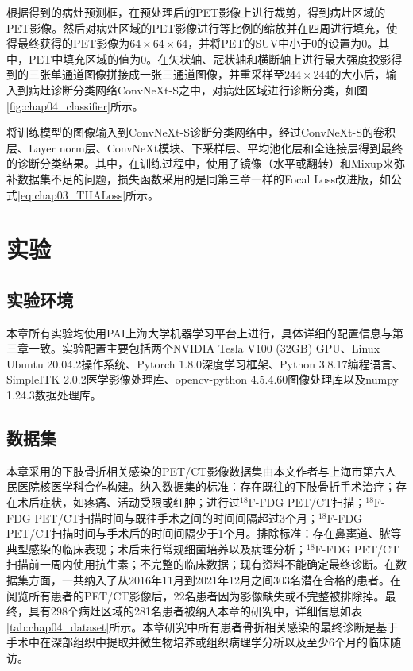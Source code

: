 根据得到的病灶预测框，在预处理后的PET影像上进行裁剪，得到病灶区域的PET影像。然后对病灶区域的PET影像进行等比例的缩放并在四周进行填充，使得最终获得的PET影像为\(64\times64\times64\)，并将PET的SUV中小于0的设置为0。其中，PET中填充区域的值为0。在矢状轴、冠状轴和横断轴上进行最大强度投影得到的三张单通道图像拼接成一张三通道图像，并重采样至\(244 \times 244\)的大小后，输入到病灶诊断分类网络ConvNeXt-S之中，对病灶区域进行诊断分类，如图\ref{fig:chap04_classifier}所示。

将训练模型的图像输入到ConvNeXt-S诊断分类网络中，经过ConvNeXt-S的卷积层、Layer norm层、ConvNeXt模块、下采样层、平均池化层和全连接层得到最终的诊断分类结果。其中，在训练过程中，使用了镜像（水平或翻转）和Mixup来弥补数据集不足的问题，损失函数采用的是同第三章一样的Focal Loss改进版，如公式\ref{eq:chap03_THALoss}所示。

\section{实验}

\subsection{实验环境}

本章所有实验均使用PAI上海大学机器学习平台上进行，具体详细的配置信息与第三章一致。实验配置主要包括两个NVIDIA Tesla V100 (32GB) GPU、Linux Ubuntu 20.04.2操作系统、Pytorch 1.8.0深度学习框架、Python 3.8.17编程语言、SimpleITK 2.0.2医学影像处理库、opencv-python 4.5.4.60图像处理库以及numpy 1.24.3数据处理库。

\subsection{数据集}

本章采用的下肢骨折相关感染的PET/CT影像数据集由本文作者与上海市第六人民医院核医学科合作构建。纳入数据集的标准：存在既往的下肢骨折手术治疗；存在术后症状，如疼痛、活动受限或红肿；进行过\(^{18}\)F-FDG PET/CT扫描；\(^{18}\)F-FDG PET/CT扫描时间与既往手术之间的时间间隔超过3个月；\(^{18}\)F-FDG PET/CT扫描时间与手术后的时间间隔少于1个月。排除标准：存在鼻窦道、脓等典型感染的临床表现；术后未行常规细菌培养以及病理分析；\(^{18}\)F-FDG PET/CT扫描前一周内使用抗生素；不完整的临床数据；现有资料不能确定最终诊断。在数据集方面，一共纳入了从2016年11月到2021年12月之间303名潜在合格的患者。在阅览所有患者的PET/CT影像后，22名患者因为影像缺失或不完整被排除掉。最终，具有298个病灶区域的281名患者被纳入本章的研究中，详细信息如表\ref{tab:chap04_dataset}所示。本章研究中所有患者骨折相关感染的最终诊断是基于手术中在深部组织中提取并微生物培养或组织病理学分析以及至少6个月的临床随访。

